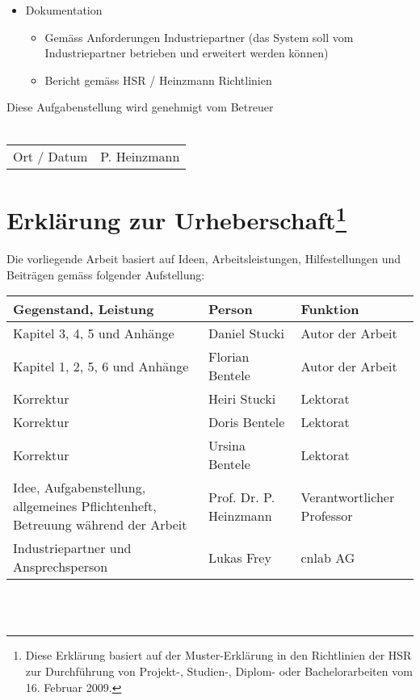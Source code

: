 \begin{itemize}
\item Dokumentation
\begin{itemize}
\item Gemäss Anforderungen Industriepartner (das System soll vom Industriepartner betrieben und erweitert werden können)
\item Bericht gemäss HSR / Heinzmann Richtlinien
\end{itemize}
\end{itemize}

Diese Aufgabenstellung wird genehmigt vom Betreuer
\\
\\

\begin{tabular}{p{3cm}p{4cm}}
\hline
Ort / Datum & P. Heinzmann
\end{tabular}

\section*{Erklärung zur Urheberschaft\footnote{Diese Erklärung basiert auf der Muster-Erklärung in den Richtlinien der HSR zur Durchführung von Projekt-, Studien-, Diplom- oder Bachelorarbeiten vom 16. Februar 2009.}}
Die vorliegende Arbeit basiert auf Ideen, Arbeitsleistungen, Hilfestellungen und Beiträgen gemäss folgender Aufstellung:
\\

\begin{tabular}{|m{5cm}|m{3.7cm}|m{3cm}|}
\hline
Gegenstand, Leistung & Person & Funktion \\[5pt]\hline\hline
Kapitel 3, 4, 5 und Anhänge & Daniel Stucki & Autor der Arbeit\\[5pt]\hline
Kapitel 1, 2, 5, 6 und Anhänge & Florian Bentele & Autor der Arbeit\\[5pt]\hline
Korrektur & Heiri Stucki & Lektorat \\[5pt]\hline
Korrektur & Doris Bentele & Lektorat \\[5pt]\hline
Korrektur & Ursina Bentele & Lektorat \\[5pt]\hline
Idee, Aufgabenstellung, allgemeines Pflichtenheft, Betreuung während der Arbeit & Prof. Dr. P. Heinzmann & Verantwortlicher Professor \\[5pt]\hline
Industriepartner und Ansprechsperson & Lukas Frey & cnlab AG \\[5pt]\hline
\end{tabular}
\\
\\

